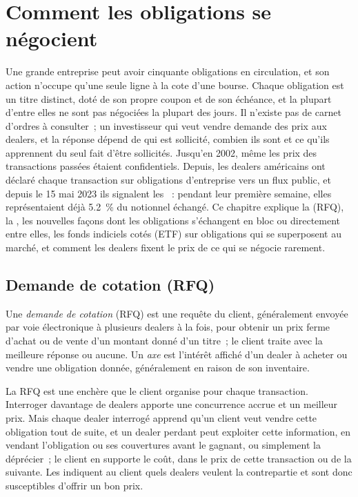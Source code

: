 \chapter{Comment les obligations se négocient}\label{ch:m2:how-bonds-trade}

Une grande entreprise peut avoir cinquante obligations en circulation, et son action
n'occupe qu'une seule ligne à la cote d'une bourse. Chaque obligation est un titre distinct, doté de son propre coupon et de son échéance, et la plupart
d'entre elles ne sont pas négociées la plupart des jours. Il n'existe pas de carnet d'ordres à consulter~; un
investisseur qui veut vendre demande des prix aux dealers, et la réponse dépend de
qui est sollicité, combien ils sont et ce qu'ils apprennent du seul fait d'être sollicités. Jusqu'en 2002, même les
prix des transactions passées étaient confidentiels. Depuis, les dealers américains ont déclaré
chaque transaction sur obligations d'entreprise vers un flux public, et depuis le 15 mai 2023 ils
signalent les ~: pendant leur première semaine, elles représentaient déjà
5.2~\% du notionnel échangé. Ce chapitre explique la  (RFQ), la , les nouvelles façons dont les obligations s'échangent en bloc ou directement entre elles, les
fonds indiciels cotés (ETF) sur obligations qui se superposent au marché, et comment les dealers
fixent le prix de ce qui se négocie rarement.

\section{Demande de cotation (RFQ)}

\begin{definition}\label{def:m2:how-bonds-trade:rfq}
Une \emph{demande de cotation} (RFQ) est une requête du client,
généralement envoyée par voie électronique à plusieurs dealers à la fois, pour obtenir un prix ferme d'achat ou
de vente d'un montant donné d'un titre~; le client traite avec la meilleure réponse ou
aucune. Un \emph{axe} est l'intérêt affiché d'un dealer à acheter ou
vendre une obligation donnée, généralement en raison de son inventaire.
\end{definition}

La RFQ est une enchère que le client organise pour chaque transaction. Interroger davantage de dealers apporte
une concurrence accrue et un meilleur prix. Mais chaque dealer interrogé apprend qu'un client
veut vendre cette obligation tout de suite, et un dealer perdant peut exploiter cette information, en vendant
l'obligation ou ses couvertures avant le gagnant, ou simplement la déprécier~; le client
en supporte le coût, dans le prix de cette transaction ou de la suivante. Les  indiquent au
client quels dealers veulent la contrepartie et sont donc susceptibles d'offrir un bon prix.

